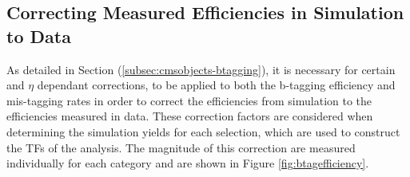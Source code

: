\subsection{Correcting Measured Efficiencies in Simulation to Data}
\label{subsec:formulamethodsf}

As detailed in Section (\ref{subsec:cmsobjects-btagging}), it is necessary for certain \pt and $\eta$ dependant corrections, to be applied to both the b-tagging efficiency and mis-tagging rates in order to correct the efficiencies from simulation to the efficiencies measured in data. These correction factors are considered when determining the simulation yields for each selection, which are used to construct the \ac{TF}s of the analysis. The magnitude of this correction are measured individually for each \theht category and are shown in Figure \ref{fig:btagefficiency}. 

